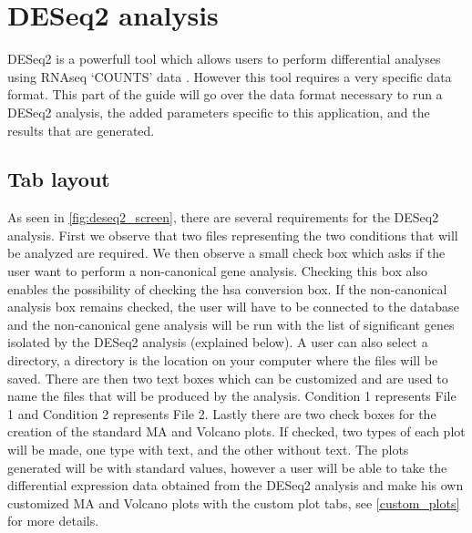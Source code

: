 \documentclass[11pt]{article}
\begin{document}
\section{DESeq2 analysis}
\acrshort{DESeq2} is a powerfull tool which allows users to perform differential analyses using RNAseq `COUNTS' data \cite{love2014moderated}. However this tool requires a very specific data format. This part of the guide will go over the data format necessary to run a \acrshort{DESeq2} analysis, the added parameters specific to this application, and the results that are generated.

\subsection{Tab layout \label{deseq2_layout}}
As seen in \autoref{fig:deseq2_screen}, there are several requirements for the \acrshort{DESeq2} analysis. First we observe that two files representing the two conditions that will be analyzed are required. We then observe a small check box which asks if the user want to perform a non-canonical gene analysis. Checking this box also enables the possibility of checking the \acrshort{hsa} conversion box. If the non-canonical analysis box remains checked, the user will have to be connected to the database and the non-canonical gene analysis will be run with the list of significant genes isolated by the \acrshort{DESeq2} analysis (explained below). A user can also select a directory, a directory is the location on your computer where the files will be saved.
There are then two text boxes which can be customized and are used to name the files that will be produced by the analysis. Condition 1 represents File 1 and Condition 2 represents File 2.
Lastly there are two check boxes for the creation of the standard MA and Volcano plots. If checked, two types of each plot will be made, one type with text, and the other without text. The plots generated will be with standard values, however a user will be able to take the differential expression data obtained from the \acrshort{DESeq2} analysis and make his own customized MA and Volcano plots with the custom plot tabs, see \autoref{custom_plots} for more details.
\end{document}
